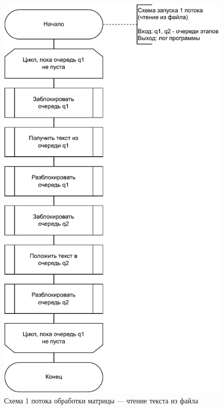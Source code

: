 \begin{figure}[h!]
	\centering
	\includegraphics[width=0.78\linewidth]{img/thread1}
	\caption{Схема 1 потока обработки матрицы --- чтение текста из файла}
	\label{fig:thread1}
\end{figure}

